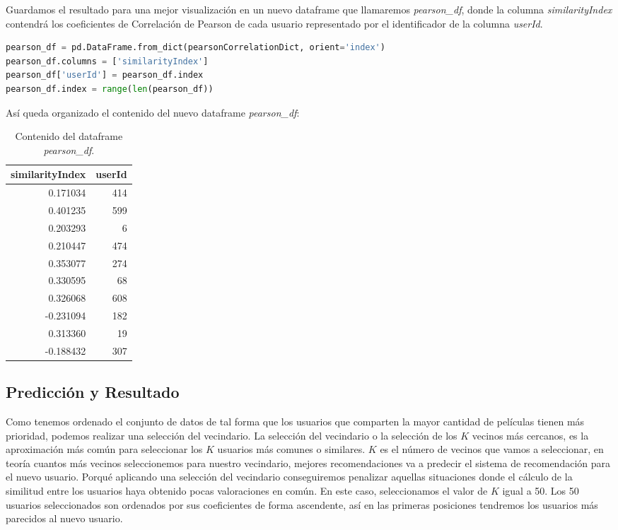 \documentclass{uimppracticas}
\begin{document}
Guardamos el resultado para una mejor visualización en un nuevo dataframe que llamaremos \textit{pearson\_df}, donde la columna \textit{similarityIndex} contendrá los coeficientes de Correlación de Pearson de cada usuario representado por el identificador de la columna \textit{userId}.

\begin{lstlisting}[language=python, basicstyle=\small]
pearson_df = pd.DataFrame.from_dict(pearsonCorrelationDict, orient='index')
pearson_df.columns = ['similarityIndex']
pearson_df['userId'] = pearson_df.index
pearson_df.index = range(len(pearson_df))
\end{lstlisting}

\newpage

Así queda organizado el contenido del nuevo dataframe \textit{pearson\_df}:

\begin{table}[H]
	\centering
	\begin{tabular}{rr}
		\toprule
		similarityIndex &  userId \\
		\midrule
		0.171034 &     414 \\
		0.401235 &     599 \\
		0.203293 &       6 \\
		0.210447 &     474 \\
		0.353077 &     274 \\
		0.330595 &      68 \\
		0.326068 &     608 \\
		-0.231094 &     182 \\
		0.313360 &      19 \\
		-0.188432 &     307 \\
		\bottomrule
	\end{tabular}
	\caption{Contenido del dataframe \textit{pearson\_df}.}
\label{pearson_df}
\end{table}


\subsection{Predicción y Resultado}

Como tenemos ordenado el conjunto de datos de tal forma que los usuarios que comparten la mayor cantidad de películas tienen más prioridad, podemos realizar una selección del vecindario. La selección del vecindario o la selección de los $K$ vecinos más cercanos, es la aproximación más común para seleccionar los $K$ usuarios más comunes o similares. $K$ es el número de vecinos que vamos a seleccionar, en teoría cuantos más vecinos seleccionemos para nuestro vecindario, mejores recomendaciones va a predecir el sistema de recomendación para el nuevo usuario. Porqué aplicando una selección del vecindario conseguiremos penalizar aquellas situaciones donde el cálculo de la similitud entre los usuarios haya obtenido pocas valoraciones en común. En este caso, seleccionamos el valor de $K$ igual a 50. Los 50 usuarios seleccionados son ordenados por sus coeficientes de forma ascendente, así en las primeras posiciones tendremos los usuarios más parecidos al nuevo usuario.
\end{document}
